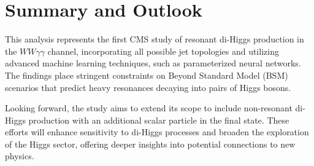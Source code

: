 \section{Summary and Outlook}
This analysis represents the first CMS study of resonant di-Higgs production in the \(WW\gamma\gamma\) channel, incorporating all possible jet topologies and utilizing advanced machine learning techniques, such as parameterized neural networks. The findings place stringent constraints on Beyond Standard Model (BSM) scenarios that predict heavy resonances decaying into pairs of Higgs bosons.

Looking forward, the study aims to extend its scope to include non-resonant di-Higgs production with an additional scalar particle in the final state. These efforts will enhance sensitivity to di-Higgs processes and broaden the exploration of the Higgs sector, offering deeper insights into potential connections to new physics.

